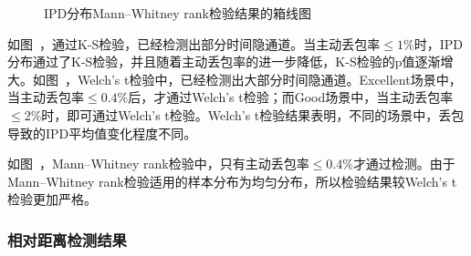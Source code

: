 {	\begin{figure}[htb]
        \centering
        \caption{IPD分布Mann–Whitney rank检验结果的箱线图}
        \label{fig:3:result:ipd:mw}
	\end{figure}
}

如图\ ，通过K-S检验，已经检测出部分时间隐通道。当主动丢包率$\le 1\%$时，IPD分布通过了K-S检验，并且随着主动丢包率的进一步降低，K-S检验的p值逐渐增大。如图\ ，Welch's t检验中，已经检测出大部分时间隐通道。Excellent场景中，当主动丢包率$\le 0.4\%$后，才通过Welch's t检验；而Good场景中，当主动丢包率$\le 2\%$时，即可通过Welch's t检验。Welch's t检验结果表明，不同的场景中，丢包导致的IPD平均值变化程度不同。

如图\ ，Mann–Whitney rank检验中，只有主动丢包率$\le 0.4\%$才通过检测。由于Mann–Whitney rank检验适用的样本分布为均匀分布，所以检验结果较Welch's t检验更加严格。

\subsubsection{相对距离检测结果}
\label{chap:analyze:result:ipd:distance}

